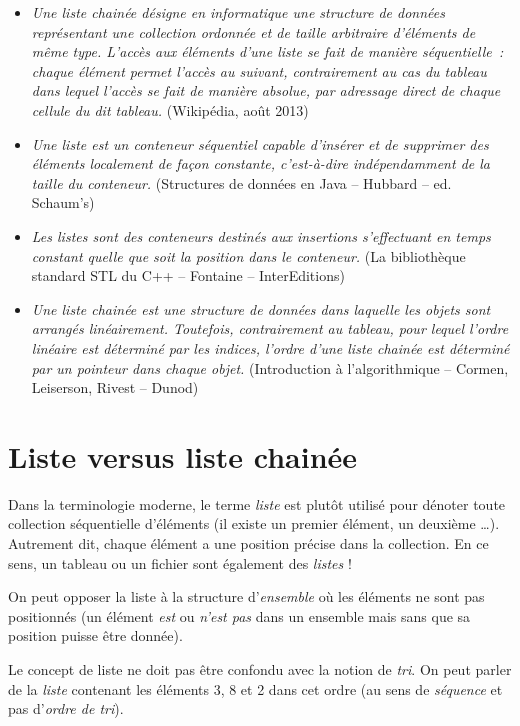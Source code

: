 	\begin{itemize}
		\item 
			\textit{Une liste chainée désigne en informatique une structure de données
			représentant une collection ordonnée et de taille arbitraire d'éléments 
			de même type. L'accès aux éléments d'une liste se fait de manière 
			séquentielle~: chaque élément permet l'accès au suivant, 
			contrairement au cas du tableau dans lequel l'accès se fait de
			manière absolue, par adressage direct de chaque cellule 
			du dit tableau.} 
			(Wikipédia, août 2013)
		\item
			\textit{Une liste est un conteneur séquentiel capable d'insérer 
			et de supprimer des éléments localement de façon constante, 
			c'est-à-dire indépendamment de la taille du conteneur.} 
			(Structures de données en Java -- Hubbard -- ed. Schaum's)
	\item
		\textit{Les listes sont des conteneurs destinés aux insertions 
		s'effectuant en temps constant quelle que soit la position 
		dans le conteneur.} 
		(La bibliothèque standard STL du C++ -- Fontaine -- InterEditions)
	\item
		\textit{Une liste chainée est une structure de données dans 
		laquelle les objets sont arrangés linéairement. Toutefois,
		contrairement au tableau, pour lequel l'ordre linéaire est 
		déterminé par les indices, l'ordre d'une liste chainée est
		déterminé par un pointeur dans chaque objet.} 
		(Introduction à l'algorithmique -- Cormen, Leiserson, Rivest -- Dunod)
\end{itemize}


\section{Liste versus liste chainée}

	Dans la terminologie moderne, le terme \textit{liste} est 
	plutôt utilisé pour dénoter toute collection séquentielle
	d'éléments (il existe un premier élément, un deuxième {\dots}). 
	Autrement dit, chaque élément a une position précise dans
	la collection. En ce sens, un tableau ou un fichier sont 
	également des \textit{listes} !
	
	On peut opposer la liste à la structure d'\textit{ensemble} 
	où les éléments ne sont pas positionnés (un élément
	\textit{est} ou \textit{n'est pas} dans un ensemble mais 
	sans que sa position puisse être donnée).
	
	Le concept de liste ne doit pas être confondu avec la notion 
	de \textit{tri}. On peut parler de la \textit{liste}
	contenant les éléments 3, 8 et 2 dans cet ordre 
	(au sens de \textit{séquence} et pas d'\textit{ordre de tri}).


